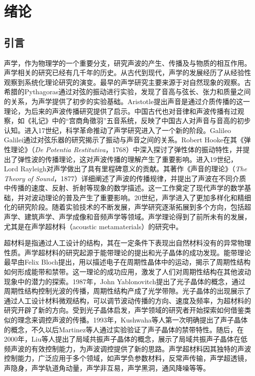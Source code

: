 \chapter{绪论}

\section{引言}
声学，作为物理学的一个重要分支，研究声波的产生、传播及与物质的相互作用。声学相关的研究已经有几千年的历史。从古代到现代，声学的发展经历了从经验性观察到系统化理论研究的演变。最早的声学研究主要来源于对自然现象的观察。古希腊的Pythagoras通过对弦的振动进行实验，发现了音高与弦长、张力和质量之间的关系，为声学提供了初步的实验基础。Aristotle提出声音是通过介质传播的这一理论，为后来的声波传播研究提供了启示。中国古代也对音律和声波传播有过观察，如《礼记》中的“宫商角徵羽”五音系统，反映了中国古人对声音与音高的初步认知。进入17世纪，科学革命推动了声学研究进入了一个新的阶段。Galileo Galilei通过对弦乐器的研究揭示了振动与声音之间的关系。Robert Hooke在其《弹性理论》（\textit{De Potentia Restitutiva}，1768）中深入探讨了弹性体的振动特性，并提出了弹性波的传播理论，这对声波传播的理解产生了重要影响。进入19世纪，Lord Rayleigh对声学做出了具有里程碑意义的贡献。其著作《声音的理论》（\textit{The Theory of Sound}，1877）详细阐述了声波的传播规律，并提出了声波在不同介质中传播的速度、反射、折射等现象的数学描述。这一工作奠定了现代声学的数学基础，并对波动理论的普及产生了重要影响。20世纪，声学进入了更加多样化和精细化的研究阶段。随着实验技术的不断发展，声学研究逐渐拓展到多个方向，包括超声学、建筑声学、声学成像和音频声学等领域。声学理论得到了前所未有的发展，尤其是在声学超材料（acoustic metamaterials）的研究中。

超材料是指通过人工设计的结构，其在一定条件下表现出自然材料没有的异常物理性质。声学超材料的研究起源于能带理论的提出和光子晶体的成功发现。能带理论最早由Felix Bloch提出\cite{a1}，用以描述电子在周期性晶体中的运动，揭示了周期性结构如何形成能带和禁带。这一理论的成功应用，激发了人们对周期性结构在其他波动现象中的潜力的探索。1987年，John Yablonovitch提出了光子晶体的概念\cite{a2}，通过周期性结构控制光波的传播，周期性结构产成了光学带隙。光子晶体的出现展示了通过人工设计材料微观结构，可以调节波动传播的方向、速度及频率，为超材料的研究开辟了新的方向\cite{a3,a4,a5}。受到光子晶体启发，声学领域的研究者开始探索如何借鉴类似的理念来调控声波的传播。1993年，Kushwaha等人第一次明确提出了声子晶体的概念\cite{b1}，不久以后Martinez等人通过实验验证了声子晶体的禁带特性\cite{b2,b3}。随后，在2000年，Liu等人提出了局域共振声子晶体的概念\cite{b4}，展示了局域共振声子晶体在低频声波的有效控制能力，为声波调控提供了新的思路。声学超材料因其独特的声波控制能力，广泛应用于多个领域，如声学负参数材料\cite{c11,c12,c13,c14,c15,c16,c17,c18}，反常声传输\cite{c21,c22,c23,c24,c25,c26,c27,c28,c29,c210,c211,c212}，声学超透镜\cite{c31,c32,c33,c34,c35,c36,c37,c38,c39,c310,c311,c312,c313,c314}，声隐身\cite{c41,c42,c43,c44,c45,c46}，声学轨道角动量\cite{c51,c52,c53,c54,c55,c56,c57,c58,c59,c510,c511,c512}，声学非互易\cite{c61,c62,c63,c64,c65,c66,c67}，声学黑洞\cite{c71,c72,c73,c74,c75,c76,c77,c78,c79,c710}，通风降噪\cite{c81,c82,c83,c84,c85}等等。

